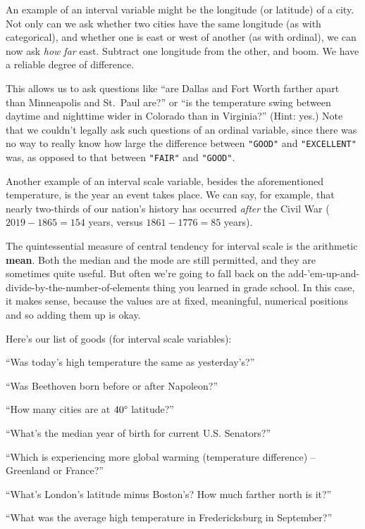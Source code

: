An example of an interval variable might be the longitude (or latitude) of a
city. Not only can we ask whether two cities have the same longitude (as with
categorical), and whether one is east or west of another (as with ordinal), we
can now ask \textit{how far} east. Subtract one longitude from the other, and
boom. We have a reliable degree of difference.

This allows us to ask questions like ``are Dallas and Fort Worth farther apart
than Minneapolis and St.~Paul are?'' or ``is the temperature swing between
daytime and nighttime wider in Colorado than in Virginia?'' (Hint: yes.) Note
that we couldn't legally ask such questions of an ordinal variable, since there
was no way to really know how large the difference between \texttt{"GOOD"} and
\texttt{"EXCELLENT"} was, as opposed to that between \texttt{"FAIR"} and
\texttt{"GOOD"}.

Another example of an interval scale variable, besides the aforementioned
temperature, is the year an event takes place. We can say, for example, that
nearly two-thirds of our nation's history has occurred \textit{after} the Civil
War ($2019-1865=154$ years, versus $1861-1776=85$ years).

The quintessential measure of central tendency for interval scale is the
arithmetic \textbf{mean}. Both the median and the mode are still permitted, and
they are sometimes quite useful. But often we're going to fall back on the
add-'em-up-and-divide-by-the-number-of-elements thing you learned in grade
school. In this case, it makes sense, because the values are at fixed,
meaningful, numerical positions and so adding them up is okay.

Here's our list of goods (for interval scale variables):

\begin{compactitem}
\item[\leftthumbsup] ``Was today's high temperature the same as yesterday's?''
\item[\leftthumbsup] ``Was Beethoven born before or after Napoleon?''
\item[\leftthumbsup] ``How many cities are at $40\degree$ latitude?''
\item[\leftthumbsup] ``What's the median year of birth for current U.S. Senators?''
\item[\leftthumbsup] ``Which is experiencing more global warming
(temperature difference) -- Greenland or France?''
\item[\leftthumbsup] ``What's London's latitude minus Boston's? How much
farther north is it?''
\item[\leftthumbsup] ``What was the average high temperature in Fredericksburg
in September?''
\end{compactitem}

